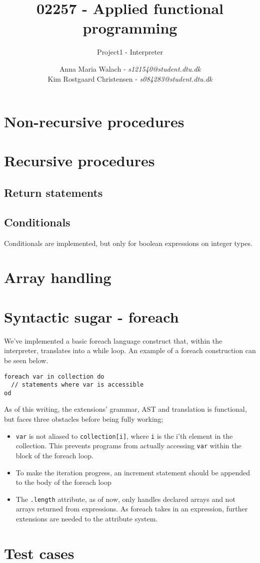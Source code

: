\documentclass[11pt]{scrartcl}
\title{02257 - Applied functional programming}
\subtitle{Project1 - Interpreter}
\author{Anna Maria Walach - \textit {s121540@student.dtu.dk} \\ Kim Rostgaard Christensen - \textit {s084283@student.dtu.dk}}
\begin{document}
\maketitle
\section{Non-recursive procedures}

\section{Recursive procedures}
\subsection{Return statements}
\subsection{Conditionals}
Conditionals are implemented, but only for boolean expressions on integer types.


\section{Array handling}

\section{Syntactic sugar - foreach}
We've implemented a basic foreach language construct that, within the interpreter, translates into a while loop. An example of a foreach construction can be seen below.
  \begin{lstlisting}
foreach var in collection do
  // statements where var is accessible
od
 \end{lstlisting}
 As of this writing, the extensions' grammar, AST and translation is functional, but faces three obstacles before being fully working;
 \begin{itemize}
   \item \texttt{var} is not aliased to \texttt{collection[i]}, where \texttt{i} is the i'th element in the collection. This prevents programs from actually accessing \texttt{var} within the block of the foreach loop.
   \item To make the iteration progress, an increment statement should be appended to the body of the foreach loop
   \item The \texttt{.length} attribute, as of now, only handles declared arrays and not arrays returned from expressions. As foreach takes in an expression, further extensions are needed to the attribute system. 
 \end{itemize}
   \section{Test cases}
\end{document}
